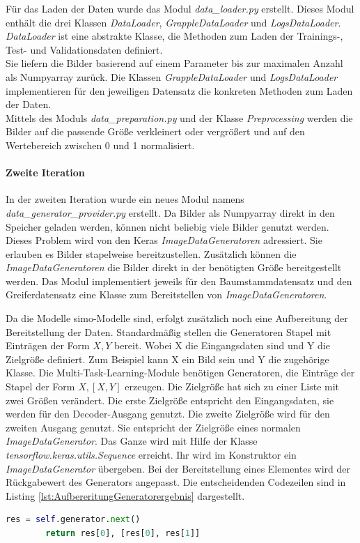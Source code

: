 	Für das Laden der Daten wurde das Modul \textit{data\_loader.py} erstellt. Dieses Modul enthält die drei Klassen \textit{DataLoader}, \textit{GrappleDataLoader} und \textit{LogsDataLoader}. \textit{DataLoader} ist eine abstrakte Klasse, die Methoden zum Laden der Trainings-, Test- und Validationsdaten definiert. \\ 
	Sie liefern die Bilder basierend auf einem Parameter bis zur maximalen Anzahl als Numpyarray zurück. Die Klassen \textit{GrappleDataLoader} und \textit{LogsDataLoader} implementieren für den jeweiligen Datensatz die konkreten Methoden zum Laden der Daten. \\
	Mittels des Moduls \textit{data\_preparation.py} und der Klasse \textit{Preprocessing} werden die Bilder auf die passende Größe verkleinert oder vergrößert und auf den Wertebereich zwischen 0 und 1 normalisiert.
	
	\paragraph{Zweite Iteration} 
	In der zweiten Iteration wurde ein neues Modul namens \\ \textit{data\_generator\_provider.py} erstellt. Da Bilder als Numpyarray direkt in den Speicher geladen werden, können nicht beliebig viele Bilder genutzt werden. Dieses Problem wird von den Keras \textit{ImageDataGeneratoren} \cite{Chollet.2015} adressiert. Sie erlauben es Bilder stapelweise bereitzustellen. Zusätzlich können die \textit{ImageDataGeneratoren} die Bilder direkt in der benötigten Größe bereitgestellt werden. Das Modul implementiert jeweils für den Baumstammdatensatz und den Greiferdatensatz eine Klasse zum Bereitstellen von \textit{ImageDataGeneratoren}.
	
	Da die Modelle \ac{simo}-Modelle sind, erfolgt zusätzlich noch eine Aufbereitung der Bereitstellung der Daten. Standardmäßig stellen die Generatoren Stapel mit Einträgen der Form $X ,Y$  bereit. Wobei X die Eingangsdaten sind und Y die Zielgröße definiert. Zum Beispiel kann X ein Bild sein und Y die zugehörige Klasse. Die Multi-Task-Learning-Module benötigen Generatoren, die Einträge der Stapel der Form $X, [X, Y]$ erzeugen. Die Zielgröße hat sich zu einer Liste mit zwei Größen verändert. Die erste Zielgröße entspricht den Eingangsdaten, sie werden für den Decoder-Ausgang genutzt. Die zweite Zielgröße wird für den zweiten Ausgang genutzt. Sie entspricht der Zielgröße eines normalen \textit{ImageDataGenerator}. Das Ganze wird mit Hilfe der Klasse \textit{tensorflow.keras.utils.Sequence} erreicht. Ihr wird im Konstruktor ein \textit{ImageDataGenerator} übergeben. Bei der Bereitstellung eines Elementes wird der Rückgabewert des Generators angepasst. Die entscheidenden Codezeilen sind in Listing \ref{lst:AufbereritungGeneratorergebnis} dargestellt. 
	\begin{lstlisting}[language=python,caption=Aufbereitung Generatorergebnis in Python, label=lst:AufbereritungGeneratorergebnis]
		res = self.generator.next()
		return res[0], [res[0], res[1]]
	\end{lstlisting}
	
